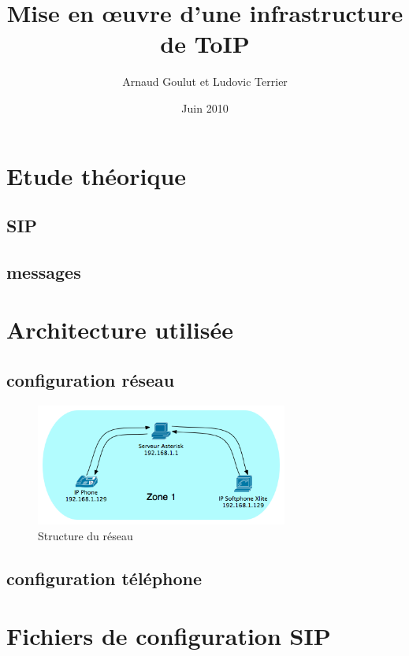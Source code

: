 \documentclass[12pt,a4paper,notitlepage]{article}
\begin{document}
\title{Mise en \oe uvre d'une infrastructure de ToIP}
\author{Arnaud Goulut et Ludovic Terrier}
\date{Juin 2010}
\maketitle



\thispagestyle{empty}


 
\section{Etude théorique}
\subsection{SIP}
\subsection{messages}

\section{Architecture utilisée}
\subsection{configuration réseau}
\begin{figure}[!h]
\begin{center}
\includegraphics[height=4cm]{structure_reseau}
\caption{Structure du réseau}
\label{fig:da}
\end{center}
\end{figure}

\subsection{configuration téléphone}
\clearpage
\section{Fichiers de configuration SIP}
\end{document}
